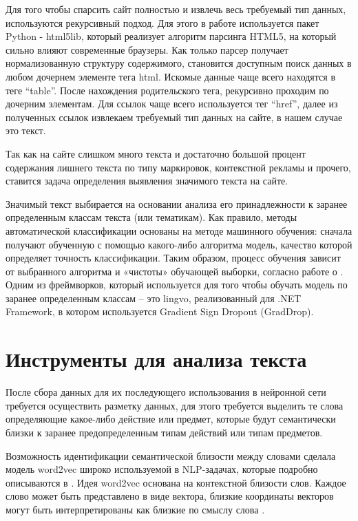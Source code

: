 Для того чтобы спарсить сайт полностью и извлечь весь требуемый тип данных, используются рекурсивный подход. 
Для этого в работе используется пакет Python - html5lib, который реализует алгоритм парсинга HTML5, 
на который сильно влияют современные браузеры. Как только парсер получает нормализованную структуру 
содержимого, становится доступным поиск данных в любом дочернем элементе тега html. 
Искомые данные чаще всего находятся в теге “table”. После нахождения родительского тега, рекурсивно проходим по дочерним элементам. 
Для ссылок чаще всего используется тег “href”, далее из полученных ссылок извлекаем требуемый тип данных на сайте, в нашем случае это текст. 

Так как на сайте слишком много текста и достаточно большой процент содержания лишнего текста по типу маркировок, 
контекстной рекламы и прочего, ставится задача определения выявления значимого текста на сайте. 

Значимый текст выбирается на основании анализа его принадлежности к заранее определенным классам текста (или тематикам). 
Как правило, методы автоматической классификации основаны на методе машинного обучения: сначала получают 
обученную с помощью какого-либо алгоритма модель, качество которой определяет точность классификации. 
Таким образом, процесс обучения зависит от выбранного алгоритма и «чистоты» обучающей выборки, согласно работе о \cite{neural04}. 
Одним из фреймворков, который используется для того чтобы обучать модель по заранее определенным классам – это lingvo, 
реализованный для  .NET Framework, в котором используется Gradient Sign Dropout (GradDrop).

\section{Инструменты для анализа текста}

После сбора данных для их последующего использования в нейронной сети требуется осуществить разметку данных, для этого требуется 
выделить те слова определяющие какое-либо действие или предмет, которые будут семантически близки к заранее предопределенным 
типам действий или типам предметов.

Возможность идентификации семантической близости между словами сделала модель word2vec широко используемой в NLP-задачах, которые подробно описываются в \cite{neural05}. 
Идея word2vec основана на контекстной близости слов. Каждое слово может быть представлено в виде вектора, 
близкие координаты векторов могут быть интерпретированы как близкие по смыслу слова \cite{seman04}. 

